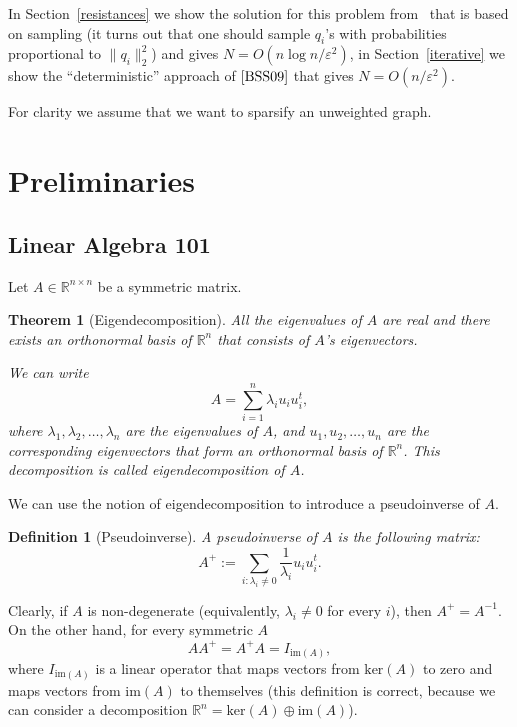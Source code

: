 \documentclass[12pt]{article}
\newcommand{\eps}{\varepsilon}
\newtheorem{theorem}{Theorem}
\newtheorem{definition}{Definition}
\begin{document}
    In Section~\ref{resistances} we show the solution for this problem from~\cite{SS11} that is based on sampling
    (it turns out that one should sample $q_i$'s with probabilities proportional to $\|q_i\|_2^2$)
    and gives $N = O(n \log n / \eps^2)$, in Section~\ref{iterative} we show the ``deterministic'' approach of
    $\cite{BSS09}$ that gives $N = O(n / \eps^2)$.

    For clarity we assume that we want to sparsify an unweighted graph.

    \section{Preliminaries}
    \label{linear_algebra}

    \subsection{Linear Algebra 101}

    Let $A \in \mathbb{R}^{n \times n}$ be a symmetric matrix. 
    \begin{theorem}[Eigendecomposition]
        All the eigenvalues
        of $A$ are real and there exists an orthonormal basis of $\mathbb{R}^n$
        that consists of $A$'s eigenvectors.

        We can write
        $$
            A = \sum_{i=1}^n \lambda_i u_i u_i^t,
        $$
        where $\lambda_1, \lambda_2, \ldots, \lambda_n$ are the eigenvalues of $A$, and
        $u_1, u_2, \ldots, u_n$ are the corresponding eigenvectors that form an orthonormal
        basis of $\mathbb{R}^n$. This decomposition is called \emph{eigendecomposition}
        of $A$.
    \end{theorem}

    We can use the notion of eigendecomposition to introduce a pseudoinverse of $A$.

    \begin{definition}[Pseudoinverse]
        A \emph{pseudoinverse} of $A$ is the following matrix:
        $$
            A^+ := \sum_{i : \lambda_i \ne 0} \frac{1}{\lambda_i} u_i u_i^t.
        $$
    \end{definition}

    Clearly, if $A$ is non-degenerate (equivalently, $\lambda_i \ne 0$ for every $i$),
    then $A^+ = A^{-1}$.
    On the other hand, for every symmetric $A$
    $$
        A A^+ = A^+ A = I_{\mathrm{im}(A)},
    $$
    where $I_{\mathrm{im}(A)}$ is a linear operator that maps vectors from $\mathrm{ker}(A)$
    to zero and maps vectors from $\mathrm{im}(A)$ to themselves (this definition is correct,
    because we can consider a decomposition
    $\mathbb{R}^n = \mathrm{ker}(A) \oplus \mathrm{im}(A)$).
\end{document}
